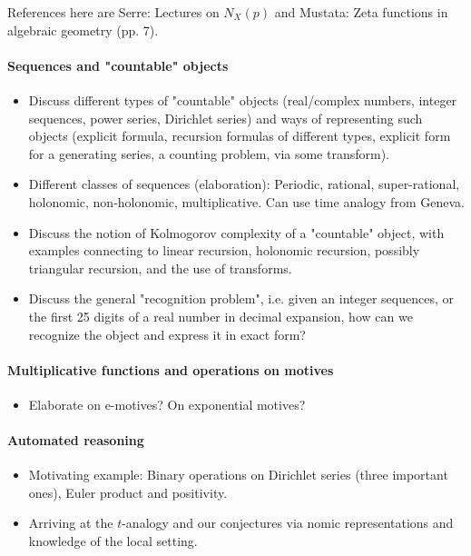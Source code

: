 \documentclass[paper=a4, fontsize=11pt]{scrartcl} %
\numberwithin{equation}{section} %
\numberwithin{figure}{section} %
\numberwithin{table}{section} %
\begin{document}
References here are Serre: Lectures on $N_X(p)$ and Mustata: Zeta functions in algebraic geometry (pp. 7).

\paragraph{Sequences and "countable" objects}

\begin{itemize}
\item Discuss different types of "countable" objects (real/complex numbers, integer sequences, power series, Dirichlet series) and ways of representing such objects (explicit formula, recursion formulas of different types, explicit form for a generating series, a counting problem, via some transform).
\item Different classes of sequences (elaboration): Periodic, rational, super-rational, holonomic, non-holonomic, multiplicative. Can use time analogy from Geneva.
\item Discuss the notion of Kolmogorov complexity of a "countable" object, with examples connecting to linear recursion, holonomic recursion, possibly triangular recursion, and the use of transforms.
\item Discuss the general "recognition problem", i.e. given an integer sequences, or the first 25 digits of a real number in decimal expansion, how can we recognize the object and express it in exact form?
\end{itemize}

\paragraph{Multiplicative functions and operations on motives}

\begin{itemize}
\item Elaborate on e-motives? On exponential motives?
\end{itemize}

\paragraph{Automated reasoning}

\begin{itemize}
\item Motivating example: Binary operations on Dirichlet series (three important ones), Euler product and positivity.
\item Arriving at the $t$-analogy and our conjectures via nomic representations and knowledge of the local setting.
\end{itemize}
\end{document}
